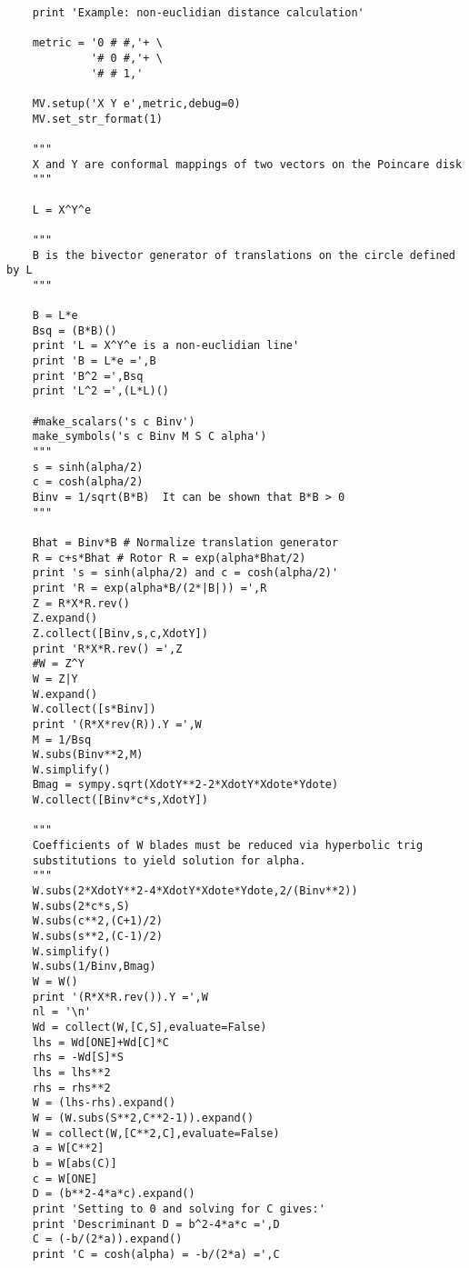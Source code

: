 \documentclass{article}
\begin{document}
\begin{verbatim}
	print 'Example: non-euclidian distance calculation'

	metric = '0 # #,'+ \
			 '# 0 #,'+ \
			 '# # 1,'

	MV.setup('X Y e',metric,debug=0)
	MV.set_str_format(1)

	"""
	X and Y are conformal mappings of two vectors on the Poincare disk
	"""

	L = X^Y^e

	"""
	B is the bivector generator of translations on the circle defined by L
	"""

	B = L*e
	Bsq = (B*B)()
	print 'L = X^Y^e is a non-euclidian line'
	print 'B = L*e =',B
	print 'B^2 =',Bsq
	print 'L^2 =',(L*L)()

	#make_scalars('s c Binv')
	make_symbols('s c Binv M S C alpha')
	"""
	s = sinh(alpha/2)
	c = cosh(alpha/2)
	Binv = 1/sqrt(B*B)  It can be shown that B*B > 0
	"""

	Bhat = Binv*B # Normalize translation generator
	R = c+s*Bhat # Rotor R = exp(alpha*Bhat/2)
	print 's = sinh(alpha/2) and c = cosh(alpha/2)'
	print 'R = exp(alpha*B/(2*|B|)) =',R
	Z = R*X*R.rev()
	Z.expand()
	Z.collect([Binv,s,c,XdotY])
	print 'R*X*R.rev() =',Z
	#W = Z^Y
	W = Z|Y
	W.expand()
	W.collect([s*Binv])
	print '(R*X*rev(R)).Y =',W
	M = 1/Bsq
	W.subs(Binv**2,M)
	W.simplify()
	Bmag = sympy.sqrt(XdotY**2-2*XdotY*Xdote*Ydote)
	W.collect([Binv*c*s,XdotY])

	"""
	Coefficients of W blades must be reduced via hyperbolic trig
	substitutions to yield solution for alpha.
	"""
	W.subs(2*XdotY**2-4*XdotY*Xdote*Ydote,2/(Binv**2))
	W.subs(2*c*s,S)
	W.subs(c**2,(C+1)/2)
	W.subs(s**2,(C-1)/2)
	W.simplify()
	W.subs(1/Binv,Bmag)
	W = W()
	print '(R*X*R.rev()).Y =',W
	nl = '\n'
	Wd = collect(W,[C,S],evaluate=False)
	lhs = Wd[ONE]+Wd[C]*C
	rhs = -Wd[S]*S
	lhs = lhs**2
	rhs = rhs**2
	W = (lhs-rhs).expand()
	W = (W.subs(S**2,C**2-1)).expand()
	W = collect(W,[C**2,C],evaluate=False)
	a = W[C**2]
	b = W[abs(C)]
	c = W[ONE]
	D = (b**2-4*a*c).expand()
	print 'Setting to 0 and solving for C gives:'
	print 'Descriminant D = b^2-4*a*c =',D
	C = (-b/(2*a)).expand()
	print 'C = cosh(alpha) = -b/(2*a) =',C
\end{verbatim}
\end{document}
